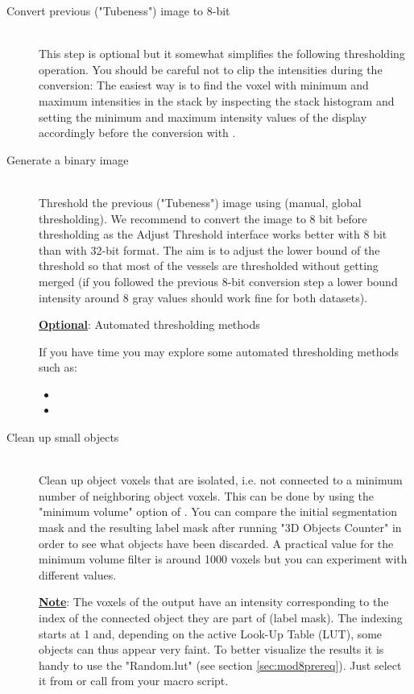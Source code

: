 \begin{description}
\item[Convert previous ("Tubeness") image to 8-bit]\hfill\\
This step is optional but it somewhat simplifies the following thresholding operation. You should be careful not to clip the intensities during the conversion: The easiest way is to find the voxel with minimum and maximum intensities in the stack by inspecting the stack histogram and setting the minimum and maximum intensity values of the display accordingly before the conversion with  . 
\item[Generate a binary image]\hfill\\
Threshold the previous ("Tubeness") image using  (manual, global thresholding). We recommend to convert the image to 8 bit before thresholding as the Adjust Threshold interface works better with 8 bit than with 32-bit format. The aim is to adjust the lower bound of the threshold so that most of the vessels are thresholded without getting merged (if you followed the previous 8-bit conversion step a lower bound intensity around 8 gray values should work fine for both datasets).

\textbf{\underline{Optional}}: Automated thresholding methods

If you have time you may explore some automated thresholding methods such as:
\begin{itemize}
\item {}
\item {}
\end{itemize}

\item[Clean up small objects] \hfill\\
Clean up object voxels that are isolated, i.e. not connected to a minimum number of neighboring object voxels. This can be done by using the "minimum volume" option of . You can compare the initial segmentation mask and the resulting label mask after running "3D Objects Counter" in order to see what objects have been discarded. A practical value for the minimum volume filter is around 1000 voxels but you can experiment with different values.

\textbf{\underline{Note}}: The voxels of the output have an intensity corresponding to the index of the connected object they are part of (label mask). The indexing starts at 1 and, depending on the active Look-Up Table (LUT), some objects can thus appear very faint. To better visualize the results it is handy to use the "Random.lut" (see section \ref{sec:mod8prereq}). Just select it from  or call  from your macro script.

\end{description}

